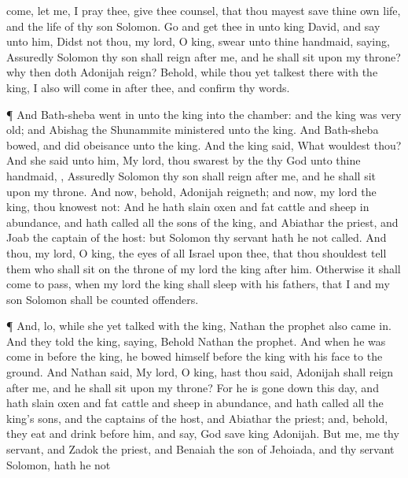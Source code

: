 {come, let me, I pray thee, give thee
counsel, that thou mayest
save thine own
life, and the
life of thy
son
Solomon.
Go and get thee
in unto
king
David, and
say unto him, Didst not thou, my
lord, O
king,
swear unto thine
handmaid,
saying,
Assuredly
Solomon thy
son shall
reign
after me, and he shall
sit upon my
throne? why then doth
Adonijah
reign?
Behold, while thou yet
talkest there with the
king, I also will come
in
after thee, and
confirm thy
words.
\par }{\PP {}¶ And
Bath-sheba went
in unto the
king into the
chamber: and the
king was
very
old; and
Abishag the
Shunammite
ministered unto the
king.
And
Bath-sheba
bowed, and did
obeisance unto the
king. And the
king
said, What wouldest thou?
And she
said unto him, My
lord, thou
swarest by the
{} thy
God unto thine
handmaid,
{}, Assuredly
Solomon thy
son shall
reign
after me, and he shall
sit upon my
throne.
And now, behold,
Adonijah
reigneth; and now, my
lord the
king, thou
knowest
{} not:
And he hath
slain
oxen and fat
cattle and
sheep in
abundance, and hath
called all the
sons of the
king, and
Abiathar the
priest, and
Joab the
captain of the
host: but
Solomon thy
servant hath he not
called.
And thou, my
lord, O
king, the
eyes of all
Israel
{} upon thee, that thou shouldest
tell them who shall
sit on the
throne of my
lord the
king
after him.
Otherwise it shall come to pass, when my
lord the
king shall
sleep with his
fathers, that I and my
son
Solomon shall be counted
offenders.
\par }{\PP {}¶ And, lo, while she yet
talked with the
king,
Nathan the
prophet also came
in.
And they
told the
king,
saying, Behold
Nathan the
prophet. And when he was come
in
before the
king, he
bowed himself before the
king with his
face to the
ground.
And
Nathan
said, My
lord, O
king, hast thou
said,
Adonijah shall
reign
after me, and he shall
sit upon my
throne?
For he is gone
down this
day, and hath
slain
oxen and fat
cattle and
sheep in
abundance, and hath
called all the
king’s
sons, and the
captains of the
host, and
Abiathar the
priest; and, behold, they
eat and
drink
before him, and
say, God
save
king
Adonijah.
But me,
{} me thy
servant, and
Zadok the
priest, and
Benaiah the
son of
Jehoiada, and thy
servant
Solomon, hath he not
}
